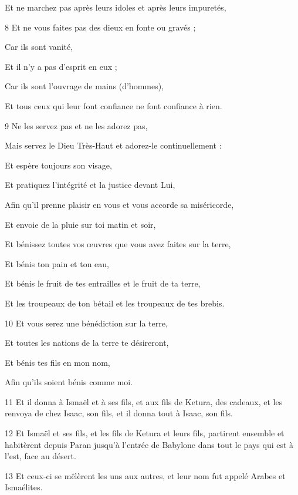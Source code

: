 \par     Et ne marchez pas après leurs idoles et après leurs impuretés,  
\par    
\par 8 Et ne vous faites pas des dieux en fonte ou gravés ;
\par    
\par     Car ils sont vanité,  
\par     Et il n’y a pas d’esprit en eux ;
\par    
\par     Car ils sont l'ouvrage de mains (d'hommes),  
\par     Et tous ceux qui leur font confiance ne font confiance à rien.
\par    
\par 9 Ne les servez pas et ne les adorez pas,  
\par     Mais servez le Dieu Très-Haut et adorez-le continuellement :  
\par     Et espère toujours son visage,  
\par     Et pratiquez l'intégrité et la justice devant Lui,
\par    
\par     Afin qu'il prenne plaisir en vous et vous accorde sa miséricorde,  
\par     Et envoie de la pluie sur toi matin et soir,
\par    
\par     Et bénissez toutes vos œuvres que vous avez faites sur la terre,  
\par     Et bénis ton pain et ton eau,
\par    
\par     Et bénis le fruit de tes entrailles et le fruit de ta terre,  
\par     Et les troupeaux de ton bétail et les troupeaux de tes brebis.
\par    
\par 10 Et vous serez une bénédiction sur la terre,  
\par     Et toutes les nations de la terre te désireront,
\par    
\par     Et bénis tes fils en mon nom,  
\par     Afin qu'ils soient bénis comme moi.
\par    
\par 11 Et il donna à Ismaël et à ses fils, et aux fils de Ketura, des cadeaux, et les renvoya de chez Isaac, son fils, et il donna tout à Isaac, son fils.
\par 12 Et Ismaël et ses fils, et les fils de Ketura et leurs fils, partirent ensemble et habitèrent depuis Paran jusqu'à l'entrée de Babylone dans tout le pays qui est à l'est, face au désert.
\par 13 Et ceux-ci se mêlèrent les uns aux autres, et leur nom fut appelé Arabes et Ismaélites.

